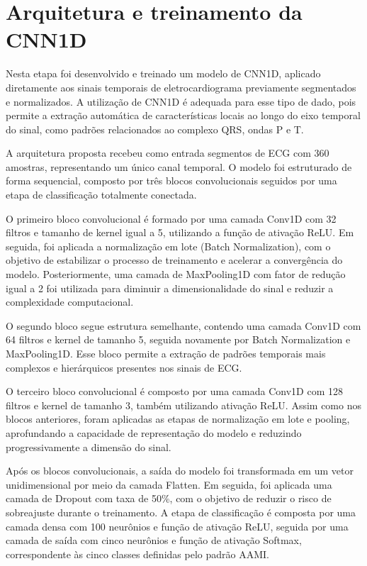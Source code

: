 \section{Arquitetura e treinamento da CNN1D}

Nesta etapa foi desenvolvido e treinado um modelo de CNN1D, aplicado diretamente aos sinais temporais de eletrocardiograma previamente 
segmentados e normalizados. A utilização de CNN1D é adequada para esse tipo de dado, pois permite a extração automática de características 
locais ao longo do eixo temporal do sinal, como padrões relacionados ao complexo QRS, ondas P e T.

A arquitetura proposta recebeu como entrada segmentos de ECG com 360 amostras, representando um único canal temporal. O modelo foi estruturado 
de forma sequencial, composto por três blocos convolucionais seguidos por uma etapa de classificação totalmente conectada.

O primeiro bloco convolucional é formado por uma camada Conv1D com 32 filtros e tamanho de kernel igual a 5, utilizando a função de ativação 
ReLU. Em seguida, foi aplicada a normalização em lote (Batch Normalization), com o objetivo de estabilizar o processo de treinamento e acelerar
a convergência do modelo. Posteriormente, uma camada de MaxPooling1D com fator de redução igual a 2 foi utilizada para diminuir a 
dimensionalidade do sinal e reduzir a complexidade computacional.

O segundo bloco segue estrutura semelhante, contendo uma camada Conv1D com 64 filtros e kernel de tamanho 5, seguida novamente por Batch 
Normalization e MaxPooling1D. Esse bloco permite a extração de padrões temporais mais complexos e hierárquicos presentes nos sinais de ECG.

O terceiro bloco convolucional é composto por uma camada Conv1D com 128 filtros e kernel de tamanho 3, também utilizando ativação ReLU. Assim 
como nos blocos anteriores, foram aplicadas as etapas de normalização em lote e pooling, aprofundando a capacidade de representação do 
modelo e reduzindo progressivamente a dimensão do sinal.

Após os blocos convolucionais, a saída do modelo foi transformada em um vetor unidimensional por meio da camada Flatten. Em seguida, foi 
aplicada uma camada de Dropout com taxa de 50\%, com o objetivo de reduzir o risco de sobreajuste durante o treinamento. A etapa de classificação
é composta por uma camada densa com 100 neurônios e função de ativação ReLU, seguida por uma camada de saída com cinco neurônios e função de 
ativação Softmax, correspondente às cinco classes definidas pelo padrão AAMI.

